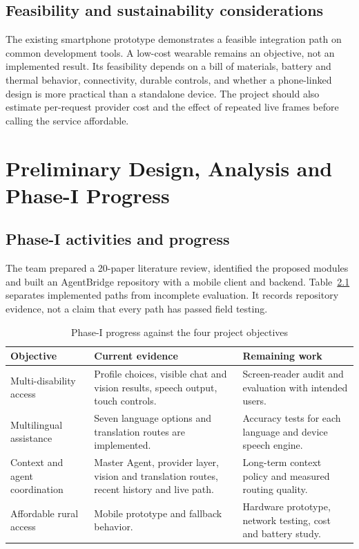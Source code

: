 \documentclass[12pt,a4paper,oneside]{report}
\begin{document}
\section{Feasibility and sustainability considerations}
The existing smartphone prototype demonstrates a feasible integration path on common development tools. A low-cost wearable remains an objective, not an implemented result. Its feasibility depends on a bill of materials, battery and thermal behavior, connectivity, durable controls, and whether a phone-linked design is more practical than a standalone device. The project should also estimate per-request provider cost and the effect of repeated live frames before calling the service affordable.

\chapter{Preliminary Design, Analysis and Phase-I Progress}
\section{Phase-I activities and progress}
The team prepared a 20-paper literature review, identified the proposed modules and built an AgentBridge repository with a mobile client and backend. Table~\ref{tab:progress} separates implemented paths from incomplete evaluation. It records repository evidence, not a claim that every path has passed field testing.
\begin{table}[H]\centering\small\renewcommand{\arraystretch}{1.14}
\caption{Phase-I progress against the four project objectives}\label{tab:progress}
\begin{tabularx}{\textwidth}{|p{}|p{}|X|}\hline
\textbf{Objective} & \textbf{Current evidence} & \textbf{Remaining work}\\\hline
Multi-disability access & Profile choices, visible chat and vision results, speech output, touch controls. & Screen-reader audit and evaluation with intended users.\\\hline
Multilingual assistance & Seven language options and translation routes are implemented. & Accuracy tests for each language and device speech engine.\\\hline
Context and agent coordination & Master Agent, provider layer, vision and translation routes, recent history and live path. & Long-term context policy and measured routing quality.\\\hline
Affordable rural access & Mobile prototype and fallback behavior. & Hardware prototype, network testing, cost and battery study.\\\hline
\end{tabularx}
\end{table}
\end{document}
